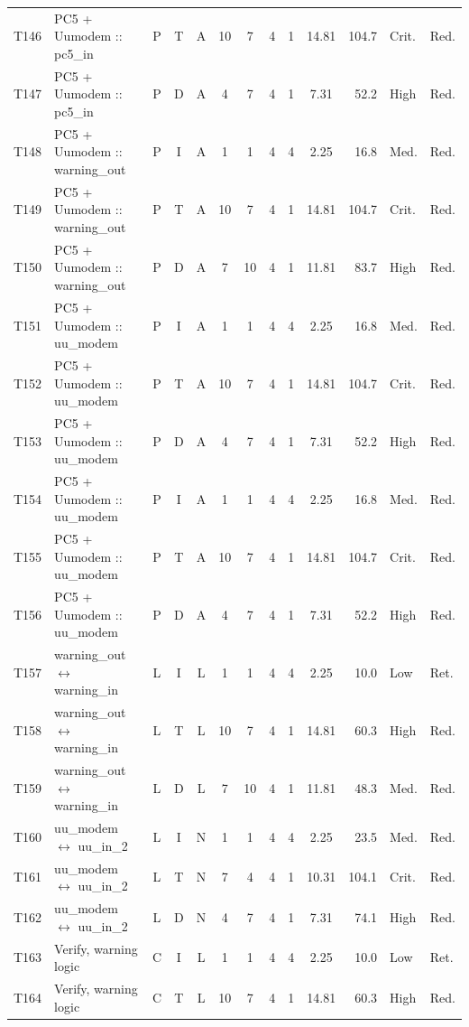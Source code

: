 \documentclass[9pt]{extarticle}
\begin{document}
\begin{longtable}{l>{\raggedright\arraybackslash}p{6.3cm}ccccccccrll}
T146 & PC5 + Uumodem :: pc5\_in & P & T & A & 10 & 7 & 4 & 1 & 14.81 & 104.7 & Crit. & Red. \\
T147 & PC5 + Uumodem :: pc5\_in & P & D & A & 4 & 7 & 4 & 1 & 7.31 & 52.2 & High & Red. \\
T148 & PC5 + Uumodem :: warning\_out & P & I & A & 1 & 1 & 4 & 4 & 2.25 & 16.8 & Med. & Red. \\
T149 & PC5 + Uumodem :: warning\_out & P & T & A & 10 & 7 & 4 & 1 & 14.81 & 104.7 & Crit. & Red. \\
T150 & PC5 + Uumodem :: warning\_out & P & D & A & 7 & 10 & 4 & 1 & 11.81 & 83.7 & High & Red. \\
T151 & PC5 + Uumodem :: uu\_modem & P & I & A & 1 & 1 & 4 & 4 & 2.25 & 16.8 & Med. & Red. \\
T152 & PC5 + Uumodem :: uu\_modem & P & T & A & 10 & 7 & 4 & 1 & 14.81 & 104.7 & Crit. & Red. \\
T153 & PC5 + Uumodem :: uu\_modem & P & D & A & 4 & 7 & 4 & 1 & 7.31 & 52.2 & High & Red. \\
T154 & PC5 + Uumodem :: uu\_modem & P & I & A & 1 & 1 & 4 & 4 & 2.25 & 16.8 & Med. & Red. \\
T155 & PC5 + Uumodem :: uu\_modem & P & T & A & 10 & 7 & 4 & 1 & 14.81 & 104.7 & Crit. & Red. \\
T156 & PC5 + Uumodem :: uu\_modem & P & D & A & 4 & 7 & 4 & 1 & 7.31 & 52.2 & High & Red. \\
T157 & warning\_out $\leftrightarrow$ warning\_in & L & I & L & 1 & 1 & 4 & 4 & 2.25 & 10.0 & Low & Ret. \\
T158 & warning\_out $\leftrightarrow$ warning\_in & L & T & L & 10 & 7 & 4 & 1 & 14.81 & 60.3 & High & Red. \\
T159 & warning\_out $\leftrightarrow$ warning\_in & L & D & L & 7 & 10 & 4 & 1 & 11.81 & 48.3 & Med. & Red. \\
T160 & uu\_modem $\leftrightarrow$ uu\_in\_2 & L & I & N & 1 & 1 & 4 & 4 & 2.25 & 23.5 & Med. & Red. \\
T161 & uu\_modem $\leftrightarrow$ uu\_in\_2 & L & T & N & 7 & 4 & 4 & 1 & 10.31 & 104.1 & Crit. & Red. \\
T162 & uu\_modem $\leftrightarrow$ uu\_in\_2 & L & D & N & 4 & 7 & 4 & 1 & 7.31 & 74.1 & High & Red. \\
T163 & Verify, warning logic & C & I & L & 1 & 1 & 4 & 4 & 2.25 & 10.0 & Low & Ret. \\
T164 & Verify, warning logic & C & T & L & 10 & 7 & 4 & 1 & 14.81 & 60.3 & High & Red. \\

\end{longtable}
\end{document}

